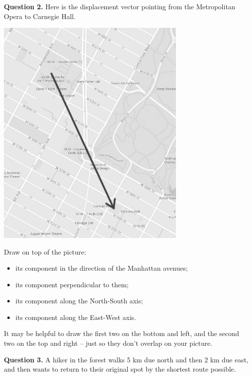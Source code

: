 \documentclass[12pt]{article}
\newcommand{\BI}{\begin{itemize}}
\newcommand{\EI}{\end{itemize}}
\def\BS{\bigskip}
\begin{document}
\vspace{3in}

	


\newpage


{\bf Question 2.} Here is the displacement vector pointing from the Metropolitan Opera to Carnegie Hall.
	\BS
	
	\begin{center}
		
		
		\includegraphics[width=0.7\textwidth]{manhattan-2.png}
		
		
	\end{center}
	
	Draw on top of the picture:
	
	\BI
	\item its component in the direction of the Manhattan avenues;
	\item its component perpendicular to them;
	\item its component along the North-South axis;
	\item its component along the East-West axis.
	\EI

	
	It may be helpful to draw the first two on the bottom and left, and the second two on the top and right -- just so they don't overlap on your picture.
	\vspace{1in}
	\vspace{3in}	

\newpage
{\bf Question 3.} A hiker in the forest walks 5 km due north and then 2 km due east, and then wants to return to their original spot by the shortest route possible. 
\end{document}
